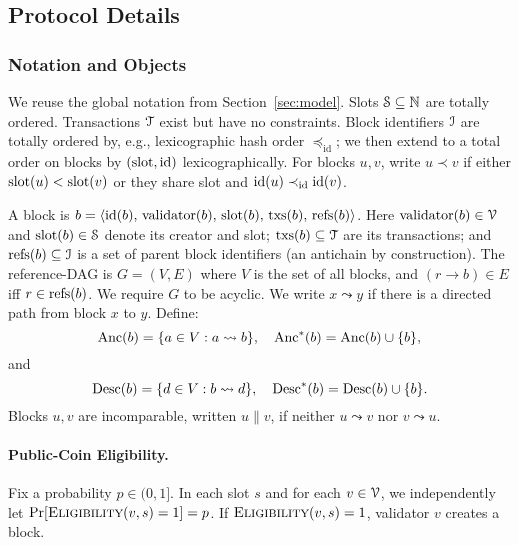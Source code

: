 \subsection{Protocol Details}

\subsubsection{Notation and Objects}
\label{subsec:ideal-notation}
We reuse the global notation from Section~\ref{sec:model}. %
Slots $\mathcal{S}\subseteq\mathbb{N}$ are totally ordered. Transactions $\mathcal{T}$ exist but have no constraints. Block identifiers $\mathcal{I}$ are totally ordered by, e.g., lexicographic hash order $\preceq_{\mathrm{id}}$; we then extend to a total order on blocks by $(\mathrm{slot},\mathrm{id})$ lexicographically. For blocks $u,v$, write $u \prec v$ if either $\mathrm{slot}(u)<\mathrm{slot}(v)$ or they share slot and $\mathrm{id}(u)\prec_{\mathrm{id}}\mathrm{id}(v)$.

A block is $b=\langle \mathrm{id}(b),\,\mathrm{validator}(b),\,\mathrm{slot}(b),\,\mathrm{txs}(b),\,\mathrm{refs}(b)\rangle$. Here $\mathrm{validator}(b)\in\mathcal{V}$ and $\mathrm{slot}(b)\in\mathcal{S}$ denote its creator and slot; $\mathrm{txs}(b)\subseteq\mathcal{T}$ are its transactions; and $\mathrm{refs}(b)\subseteq\mathcal{I}$ is a set of parent block identifiers (an antichain by construction). The reference-DAG is $G=(V,E)$ where $V$ is the set of all blocks, and $(r\to b)\in E$ iff $r\in \mathrm{refs}(b)$. We require $G$ to be acyclic. We write $x\leadsto y$ if there is a directed path from block $x$ to $y$. Define:
\begin{equation*}
\mathrm{Anc}(b)=\{a\in V: a\leadsto b\},\quad \mathrm{Anc}^*(b)=\mathrm{Anc}(b)\cup\{b\},
\end{equation*}
and 
\begin{equation*}
\mathrm{Desc}(b)=\{d\in V: b\leadsto d\},\quad \mathrm{Desc}^*(b)=\mathrm{Desc}(b)\cup\{b\}.
\end{equation*}
Blocks $u,v$ are incomparable, written $u\parallel v$, if neither $u\leadsto v$ nor $v\leadsto u$.

\paragraph{Public-Coin Eligibility.} Fix a probability $p\in(0,1]$. In each slot $s$ and for each $v\in\mathcal{V}$, we independently let $\Pr[\textsc{Eligibility}(v,s)=1] = p$. 
If $\textsc{Eligibility}(v,s)=1$, validator $v$ creates a block.

